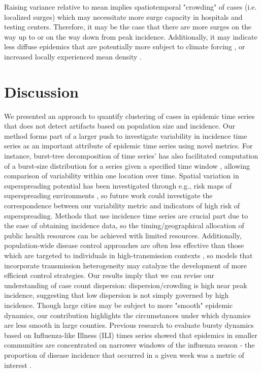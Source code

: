 \documentclass[10pt,letterpaper]{article}
\begin{document}
\noindent Raising variance relative to mean implies spatiotemporal "crowding" of cases (i.e. localized surges) which may necessitate more surge capacity in hospitals and testing centers. Therefore, it may be the case that there are more surges on the way up to or on the way down from peak incidence. 
Additionally, it may indicate less diffuse epidemics that are potentially more subject to climate forcing \cite{dalziel_urbanization_2018}, or increased locally experienced mean density \cite{lloyd_mean_1967}. 

\section*{Discussion}
We presented an approach to quantify clustering of cases in epidemic time series that does not detect artifacts based on population size and incidence. 
Our method forms part of a larger push to investigate variability in incidence time series as an important attribute of epidemic time series using novel metrics.
For instance, burst-tree decomposition of time series’ has also facilitated computation of a burst-size distribution for a series given a specified time window \cite{jo_burst-tree_2020}, allowing comparison of variability within one location over time. 
Spatial variation in superspreading potential has been investigated through e.g., risk maps of superspreading environments \cite{loo_identification_2021}, so future work could investigate the correspondence between our variability metric and indicators of high risk of superspreading.
Methods that use incidence time series are crucial part due to the ease of obtaining incidence data, so the timing/geographical allocation of public health resources can be achieved with limited resources. 
Additionally, population-wide disease control approaches are often less effective than those which are targeted to individuals in high-transmission contexts \cite{lloyd-smith_superspreading_2005}, so models that incorporate transmission heterogeneity may catalyze the development of more efficient control strategies.
Our results imply that we can revise our understanding of case count dispersion: dispersion/crowding is high near peak incidence, suggesting that low dispersion is not simply governed by high incidence. 
Though large cities may be subject to more "smooth" epidemic dynamics, our contribution highlights the circumstances under which dynamics are less smooth in large counties. 
Previous research to evaluate bursty dynamics based on Influenza-like Illness (ILI) times series showed that epidemics in smaller communities are concentrated on narrower windows of the influenza season - the proportion of disease incidence that occurred in a given week was a metric of interest \cite{dalziel_urbanization_2018}. 
\end{document}
